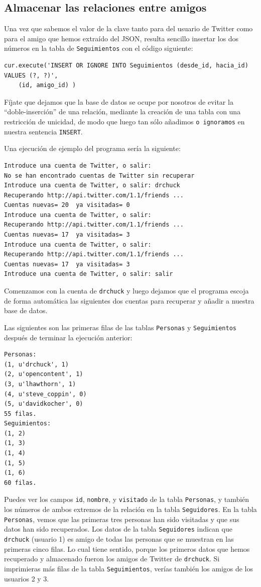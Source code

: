 \subsection{Almacenar las relaciones entre amigos}

Una vez que sabemos el valor de la clave tanto para del usuario de Twitter
como para el amigo que hemos extraído del JSON, resulta sencillo insertar
los dos números en la tabla de {\tt Seguimientos}
con el código siguiente:

\beforeverb
\begin{verbatim}
cur.execute('INSERT OR IGNORE INTO Seguimientos (desde_id, hacia_id) VALUES (?, ?)',
    (id, amigo_id) )
\end{verbatim}
\afterverb
%
Fíjate que dejamos que la base de datos se ocupe por nosotros de evitar la ``doble-inserción''
de una relación, mediante la creación de una tabla con una restricción de unicidad, de modo que
luego tan sólo añadimos {\tt o ignoramos} en nuestra sentencia {\tt INSERT}.

Una ejecución de ejemplo del programa sería la siguiente:

\beforeverb
\begin{verbatim}
Introduce una cuenta de Twitter, o salir:
No se han encontrado cuentas de Twitter sin recuperar
Introduce una cuenta de Twitter, o salir: drchuck
Recuperando http://api.twitter.com/1.1/friends ...
Cuentas nuevas= 20  ya visitadas= 0
Introduce una cuenta de Twitter, o salir: 
Recuperando http://api.twitter.com/1.1/friends ...
Cuentas nuevas= 17  ya visitadas= 3
Introduce una cuenta de Twitter, o salir:
Recuperando http://api.twitter.com/1.1/friends ...
Cuentas nuevas= 17  ya visitadas= 3
Introduce una cuenta de Twitter, o salir: salir
\end{verbatim}
\afterverb
%
Comenzamos con la cuenta de {\tt drchuck} y luego dejamos que el programa
escoja de forma automática las siguientes dos cuentas para recuperar y añadir
a nuestra base de datos.

Las siguientes son las primeras filas de las tablas {\tt Personas}
y {\tt Seguimientos} después de terminar la ejecución anterior:

\beforeverb
\begin{verbatim}
Personas:
(1, u'drchuck', 1)
(2, u'opencontent', 1)
(3, u'lhawthorn', 1)
(4, u'steve_coppin', 0)
(5, u'davidkocher', 0)
55 filas.
Seguimientos:
(1, 2)
(1, 3)
(1, 4)
(1, 5)
(1, 6)
60 filas.
\end{verbatim}
\afterverb
%
Puedes ver los campos {\tt id}, {\tt nombre}, y {\tt visitado} de la
tabla {\tt Personas}, y también los números de ambos extremos
de la relación en la tabla {\tt Seguidores}.
En la tabla {\tt Personas}, vemos que las primeras tres personas
han sido visitadas y que sus datos han sido recuperados.
Los datos de la tabla {\tt Seguidores} indican que
{\tt drchuck} (usuario 1) es amigo de todas las personas que se muestran en las primeras
cinco filas. Lo cual tiene sentido, porque
los primeros datos que hemos recuperado y almacenado fueron los amigos de Twitter de
{\tt drchuck}. Si imprimieras más filas de la tabla {\tt Seguimientos},
verías también los amigos de los usuarios 2 y 3.

